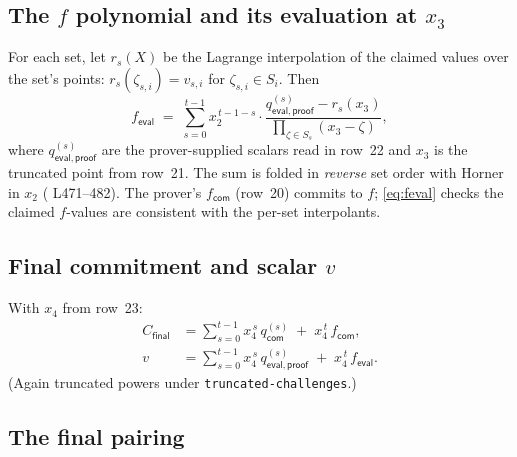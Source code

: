 \subsection{The $f$ polynomial and its evaluation at $x_3$}
\label{sec:feval}

For each set, let $r_s(X)$ be the Lagrange interpolation of the claimed
values over the set's points:
$r_s(\zeta_{s,i}) = v_{s,i}$ for $\zeta_{s,i} \in S_i$. Then
\begin{equation}
  f_{\mathsf{eval}} \;=\; \sum_{s=0}^{t-1} x_2^{\,t-1-s}\cdot
     \frac{q_{\mathsf{eval,proof}}^{(s)} - r_s(x_3)}
          {\prod_{\zeta \in S_s} (x_3 - \zeta)},
  \label{eq:feval}
\end{equation}
where $q_{\mathsf{eval,proof}}^{(s)}$ are the prover-supplied scalars read
in row~22 and $x_3$ is the truncated point from row~21. The sum is folded
in \emph{reverse} set order with Horner in $x_2$
( L471--482). The prover's $f_{\mathsf{com}}$
(row~20) commits to $f$; \eqref{eq:feval} checks the claimed $f$-values
are consistent with the per-set interpolants.

\subsection{Final commitment and scalar $v$}
\label{sec:finalcom}

With $x_4$ from row~23:
\begin{align}
  C_{\mathsf{final}} &= \sum_{s=0}^{t-1} x_4^{\,s}\, q_{\mathsf{com}}^{(s)}
     \;+\; x_4^{\,t}\, f_{\mathsf{com}}, \label{eq:finalcom}\\
  v &= \sum_{s=0}^{t-1} x_4^{\,s}\, q_{\mathsf{eval,proof}}^{(s)}
     \;+\; x_4^{\,t}\, f_{\mathsf{eval}}. \label{eq:v}
\end{align}
(Again truncated powers under \texttt{truncated-challenges}.)

\subsection{The final pairing}
\label{sec:pairing}

